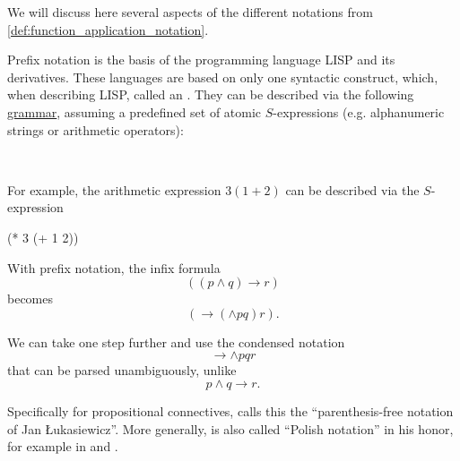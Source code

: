 \begin{remark}\label{rem:def:function_application_notation}
  We will discuss here several aspects of the different notations from \cref{def:function_application_notation}.

  \begin{thmenum}
     Prefix notation is the basis of the programming language LISP and its derivatives. These languages are based on only one syntactic construct, which, when describing LISP, \textcite[187]{McCarthy1960SExpressionsPartI} called an . They can be described via the following \hyperref[def:formal_grammar]{grammar}, assuming a predefined set of atomic \( S \)-expressions (e.g. alphanumeric strings or arithmetic operators):
    \begin{bnf*}
       { \bnfor {} \bnfsp \bnftsq{\textvisiblespace} \bnfsp {}} \\
            { \bnfor \bnftsq{(} \bnfsp {} \bnfsp \bnftsq{)}}
    \end{bnf*}

    For example, the arithmetic expression \( 3(1 + 2) \) can be described via the \( S \)-expression
    \begin{CVerbatim}[gobble=6]
      (* 3 (+ 1 2))
    \end{CVerbatim}

     With prefix notation, the infix formula
    \begin{equation*}
      ((p \wedge q) \rightarrow r)
    \end{equation*}
    becomes
    \begin{equation*}
      (\rightarrow (\wedge p q) r).
    \end{equation*}

    We can take one step further and use the condensed notation
    \begin{equation*}
      \rightarrow \wedge p q r
    \end{equation*}
    that can be parsed unambiguously, unlike
    \begin{equation*}
      p \wedge q \rightarrow r.
    \end{equation*}

    Specifically for propositional connectives, \textcite[38]{Church1956LogicVol1} calls this the \enquote{parenthesis-free notation of Jan \L{}ukasiewicz}. More generally, is also called \enquote{Polish notation} in his honor, for example in \cite[338]{Knuth1997ArtVol1} and \cite[45]{Andrews2002Logic}.


\end{thmenum}
\end{remark}
